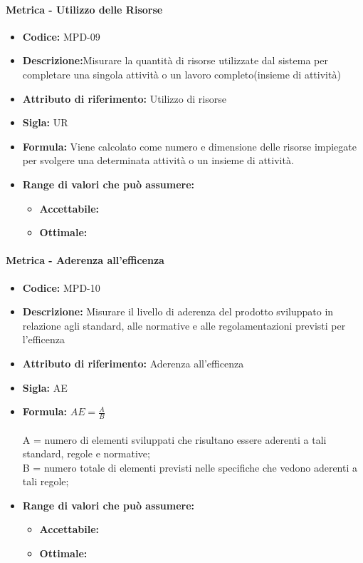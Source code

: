                \paragraph{Metrica - Utilizzo delle Risorse} 
                  \begin{itemize}
         \item   \textbf{Codice:} MPD-09
         \item   \textbf{Descrizione:}Misurare la quantità di risorse utilizzate dal sistema per completare una singola attività o un lavoro completo(insieme di attività)
          \item  \textbf{Attributo di riferimento:} Utilizzo di risorse
          \item  \textbf{Sigla:} UR
           \item \textbf{Formula:} Viene calcolato come numero e dimensione delle risorse impiegate per svolgere una determinata attività o un insieme di attività.
            \item \textbf{Range di valori che può assumere:}
        \begin{itemize}
            \item \textbf{Accettabile:} 
            \item \textbf{Ottimale:} 
        \end{itemize}
       \end{itemize}
              
      
               \paragraph{Metrica - Aderenza all'efficenza} 
                  \begin{itemize}
          \item  \textbf{Codice:} MPD-10
          \item  \textbf{Descrizione:} Misurare il livello di aderenza del prodotto sviluppato in relazione agli standard, alle normative e alle regolamentazioni previsti per l'efficenza
          \item  \textbf{Attributo di riferimento:} Aderenza all'efficenza 
          \item  \textbf{Sigla:} AE
          \item  \textbf{Formula:} \begin{math}AE = \frac{A}{B}\end{math}\\ \\
            A = numero di elementi sviluppati che risultano essere aderenti a tali standard, regole e normative;\\
            B = numero totale di elementi previsti nelle specifiche che vedono aderenti a tali regole;
          \item \textbf{Range di valori che può assumere:}
        \begin{itemize}
            \item \textbf{Accettabile:} 
            \item \textbf{Ottimale:} 
        \end{itemize}
       \end{itemize}
              
